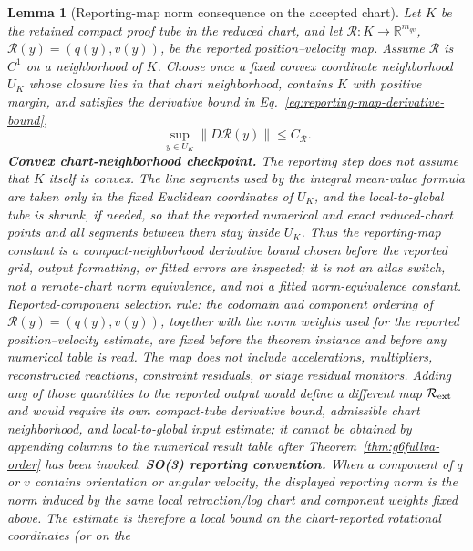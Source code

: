 \documentclass[preprint,12pt]{elsarticle}
\newtheorem{lemma}{Lemma}
\begin{document}
\begin{lemma}[Reporting-map norm consequence on the accepted chart]
\label{lem:reporting-map-norm-consequence}
Let \(K\) be the retained compact proof tube in the reduced chart, and let
\(\mathcal R:K\to\mathbb R^{m_{qv}}\), \(\mathcal R(y)=(q(y),v(y))\), be the
reported position--velocity map.  Assume \(\mathcal R\) is \(C^1\) on a
neighborhood of \(K\).  Choose once a fixed convex coordinate neighborhood
\(U_K\) whose closure lies in that chart neighborhood, contains \(K\) with
positive margin, and satisfies the derivative bound in
Eq.~\eqref{eq:reporting-map-derivative-bound},
\begin{equation}
\label{eq:reporting-map-derivative-bound}
  \sup_{y\in U_K}\|D\mathcal R(y)\|\le C_{\mathcal R}.
\end{equation}
\noindent\textbf{Convex chart-neighborhood checkpoint.}
The reporting step does not assume that \(K\) itself is convex.  The line
segments used by the integral mean-value formula are taken only in the fixed
Euclidean coordinates of \(U_K\), and the local-to-global tube is shrunk, if
needed, so that the reported numerical and exact reduced-chart points and all
segments between them stay inside \(U_K\).  Thus the reporting-map constant is
a compact-neighborhood derivative bound chosen before the reported grid,
output formatting, or fitted errors are inspected; it is not an atlas switch,
not a remote-chart norm equivalence, and not a fitted norm-equivalence
constant.
Reported-component selection rule: the codomain and component ordering of
\(\mathcal R(y)=(q(y),v(y))\), together with the norm weights used for the
reported position--velocity estimate, are fixed before the theorem instance
and before any numerical table is read.  The map does not include
accelerations, multipliers, reconstructed reactions, constraint residuals, or
stage residual monitors.  Adding any of those quantities to the reported
output would define a different map \(\mathcal R_{\rm ext}\) and would require
its own compact-tube derivative bound, admissible chart neighborhood, and
local-to-global input estimate; it cannot be obtained by appending columns to
the numerical result table after Theorem~\ref{thm:g6fullva-order} has been
invoked.
\noindent\textbf{SO(3) reporting convention.}
When a component of \(q\) or \(v\) contains orientation or angular velocity,
the displayed reporting norm is the norm induced by the same local
retraction/log chart and component weights fixed above.  The estimate is
therefore a local bound on the chart-reported rotational coordinates (or on the

\end{lemma}
\end{document}
